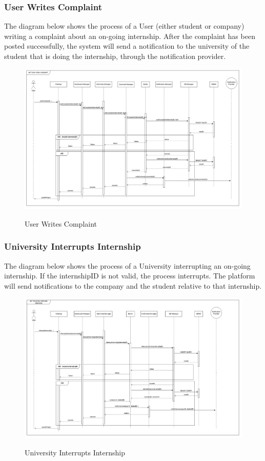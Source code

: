 \documentclass[a4paper,12pt]{article}
\begin{document}
\subsubsection*{User Writes Complaint}
The diagram below shows the process of a User (either student or company) writing a complaint about an on-going internship. After the complaint has been posted successfully, the system will send a notification to the university of the student that is doing the internship, through the notification provider.
\begin{figure}[H]
\centering
\includegraphics[scale = 0.4]{DD_figures/RuntimeView/UserWritesComplaintRV.png}\\
\caption{User Writes Complaint}
\end{figure}
\newpage

\subsubsection*{University Interrupts Internship}
The diagram below shows the process of a University interrupting an on-going internship. If the internshipID is not valid, the process interrupts. The platform will send notifications to the company and the student relative to that internship.
\begin{figure}[H]
\centering
\includegraphics[scale = 0.4]{DD_figures/RuntimeView/UniversityInterruptsInternshipRV.png}\\
\caption{University Interrupts Internship}
\end{figure}
\newpage
\end{document}

